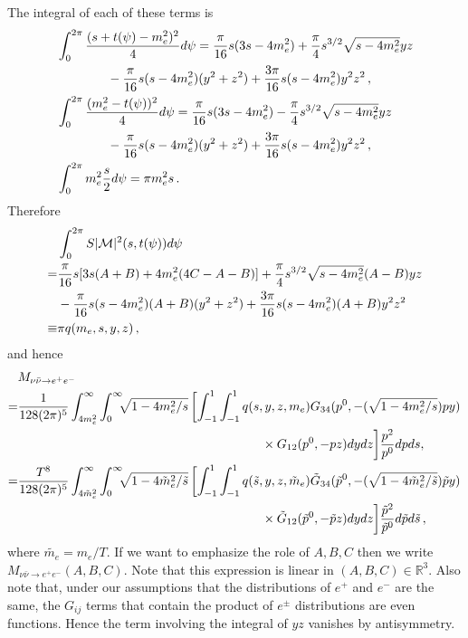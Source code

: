   The integral of each of these terms is
 \begin{align}
&\int_0^{2\pi}\frac{(s+t(\psi)-m_e^2)^2}{4}d\psi=\frac{\pi}{16}s(3s-4m_e^2)+\frac{\pi}{4}s^{3/2}\sqrt{s-4m_e^2}yz\\
&\qquad\qquad-\frac{\pi}{16}s(s-4m_e^2)(y^2+z^2)+\frac{3\pi}{16}s(s-4m_e^2)y^2z^2\,,\notag\\
&\int_0^{2\pi} \frac{(m_e^2-t(\psi))^2}{4}d\psi=\frac{\pi}{16}s(3s-4m_e^2)-\frac{\pi}{4}s^{3/2}\sqrt{s-4m_e^2}yz\notag\\
&\qquad\qquad-\frac{\pi}{16}s(s-4m_e^2)(y^2+z^2)+\frac{3\pi}{16}s(s-4m_e^2)y^2z^2\,,\notag\\
&\int_0^{2\pi} m_e^2\frac{s}{2} d\psi=\pi m_e^2s\,.\notag
\end{align}
Therefore 
\begin{align}
&\int_0^{2\pi} S |\mathcal{M}|^2 (s,t(\psi))d\psi\\
=&\frac{\pi}{16}s[3s(A+B)+4m_e^2(4C-A-B)]+\frac{\pi}{4}s^{3/2}\sqrt{s-4m_e^2}(A-B)yz\notag\\
&-\frac{\pi}{16}s(s-4m_e^2)(A+B)(y^2+z^2)+\frac{3\pi}{16}s(s-4m_e^2)(A+B)y^2z^2\notag\\
\equiv& \pi q(m_e,s,y,z)\,,\notag
\end{align}
and hence
\begin{align}
&M_{\nu\bar\nu\rightarrow e^+e^-}\\
=&\frac{1}{128(2\pi)^5 }\int_{4m_e^2}^\infty\int_0^\infty\!\!\!\sqrt{1-4m_e^2/s}\left[\int_{-1}^1\int_{-1}^1q(s,y,z,m_e)G_{34}(p^0,-(\sqrt{1-4m_e^2/s})p y)\right.\notag\\
&\hspace{68mm}\times G_{12}(p^0,-p z)dydz\bigg]\frac{ p^2}{p^0}dpds,\notag\\
=&\frac{T^8}{128(2\pi)^5 }\int_{4\tilde m_e^2}^\infty\int_0^\infty\!\!\!\sqrt{1-4\tilde m_e^2/\tilde s}\left[\int_{-1}^1 \int_{-1}^1q(\tilde s,y,z,\tilde m_e)\tilde G_{34}(\tilde p^0,-(\sqrt{1-4\tilde{m}_e^2/\tilde s})\tilde p y)\right.\notag\\
&\hspace{68mm}\times\tilde G_{12}(\tilde p^0,-\tilde p z)dydz\bigg] \frac{ \tilde p^2}{\tilde p^0}d\tilde pd\tilde s\,,\notag
\end{align}
where $\tilde{m_e}=m_e/T$.  If we want to emphasize the role of $A,B,C$ then we write $M_{\nu\bar\nu\rightarrow e^+e^-}(A,B,C)$.  Note that this expression is linear in $(A,B,C)\in\mathbb{R}^3$. Also note that, under our assumptions that the distributions of $e^+$ and $e^-$ are the same,  the $G_{ij}$ terms that contain the product of $e^\pm$ distributions are even functions. Hence the term involving the integral of $yz$ vanishes by antisymmetry.

